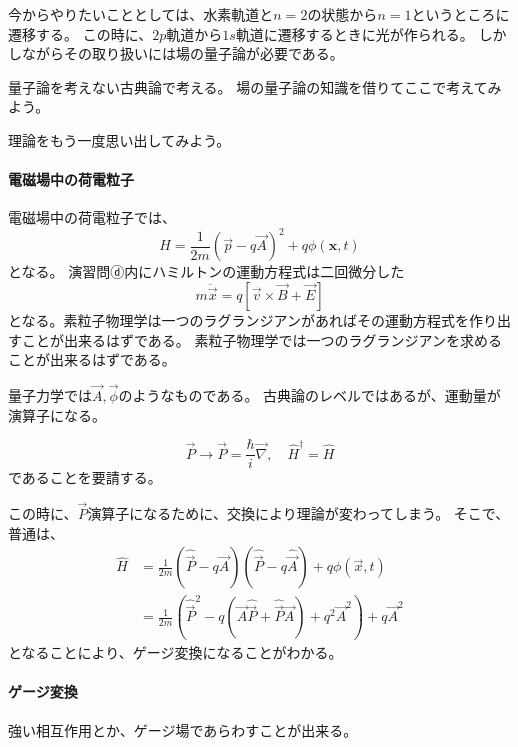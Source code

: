 \documentclass[titlepage]{ltjsarticle}
\begin{document}
今からやりたいこととしては、水素軌道と\(n=2\)の状態から\(n=1\)というところに遷移する。
この時に、\(2p\)軌道から\(1s\)軌道に遷移するときに光が作られる。
しかしながらその取り扱いには場の量子論が必要である。

量子論を考えない古典論で考える。
場の量子論の知識を借りてここで考えてみよう。

理論をもう一度思い出してみよう。


\paragraph{電磁場中の荷電粒子}
電磁場中の荷電粒子では、
\begin{equation}
  H = \frac{1}{2m} \left( \vec{p} - q \vec{A} \right)^2 + q\phi(\bm{x},t)
\end{equation}
となる。
演習問ⓓ内にハミルトンの運動方程式は二回微分した
\begin{equation}
  m \ddot{\vec{x}} = q \left[ \vec{v} \times \vec{B} + \vec{E} \right]
\end{equation}
となる。素粒子物理学は一つのラグランジアンがあればその運動方程式を作り出すことが出来るはずである。
素粒子物理学では一つのラグランジアンを求めることが出来るはずである。

量子力学では\(\vec{A},\vec{\phi}\)のようなものである。
古典論のレベルではあるが、運動量が演算子になる。

\begin{equation}
  \vec{P} \to \vec{P} = \frac{\hbar}{i} \vec{\nabla} ,\quad \hat{H}^\dagger = \hat{H}
\end{equation}
であることを要請する。

この時に、\(\vec{P}\)演算子になるために、交換により理論が変わってしまう。
そこで、普通は、
\begin{align}
  \hat{H}  & = \frac{1}{2m} \left( \hat{\vec{P}} - q \hat{\vec{A}}  \right)\left( \hat{\vec{P}} - q \hat{\vec{A}}  \right) + q \phi(\vec{x},t)\\
  & = \frac{1}{2m} \left( \hat{\vec{P}}^2 - q\left( \vec{A}\hat{\vec{P}} + \hat{\vec{P}}\vec{A} \right) + q^2 \vec{A}^2 \right) + q \vec{A}^2
\end{align}
となることにより、ゲージ変換になることがわかる。

\paragraph{ゲージ変換}
強い相互作用とか、ゲージ場であらわすことが出来る。
\end{document}
